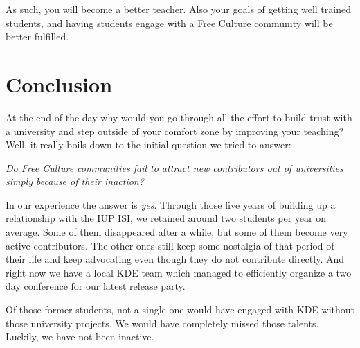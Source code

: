As such, you will become a better teacher. Also your goals of getting well
trained students, and having students engage with a Free Culture community will
be better fulfilled.

\section*{Conclusion}
At the end of the day why would you go through all the effort
to build trust with a university and step outside of your comfort zone by
improving your teaching? Well, it really boils down to the initial question we
tried to answer:

\emph{Do Free Culture communities fail to attract new contributors out of
universities simply because of their inaction?}

In our experience the answer is \emph{yes}. Through those five years of building
up a relationship with the IUP ISI, we retained around two students per year on
average. Some of them disappeared after a while, but some of them become very
active contributors. The other ones still keep some nostalgia of that period of
their life and keep advocating even though they do not contribute directly. And
right now we have a local KDE team which managed to efficiently organize a two
day conference for our latest release party.

Of those former students, not a single one would have engaged with KDE without
those university projects. We would have completely missed those talents.
Luckily, we have not been inactive.
